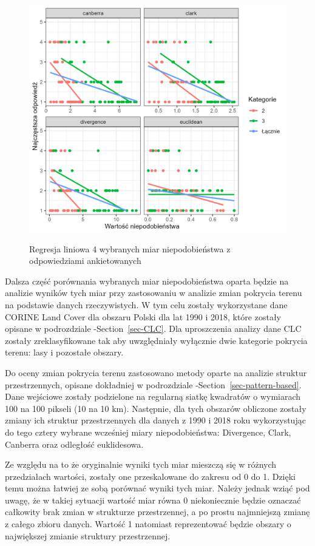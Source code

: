 \documentclass{amuthesis}
\begin{document}
\begin{figure}[t]

{\centering \includegraphics[width=4.6875in,height=4.16667in]{figures/fig-top4measures.png}

}

\caption{\label{fig-top4measures}Regresja liniowa 4 wybranych miar
niepodobieństwa z odpowiedziami ankietowanych}

\end{figure}

Dalsza część porównania wybranych miar niepodobieństwa oparta będzie na
analizie wyników tych miar przy zastosowaniu w analizie zmian pokrycia
terenu na podstawie danych rzeczywistych. W tym celu zostały
wykorzystane dane CORINE Land Cover dla obszaru Polski dla lat 1990 i
2018, które zostały opisane w podrozdziale -Section~\ref{sec-CLC}. Dla
uproszczenia analizy dane CLC zostały zreklasyfikowane tak aby
uwzględniały wyłącznie dwie kategorie pokrycia terenu: lasy i pozostałe
obszary.

Do oceny zmian pokrycia terenu zastosowano metody oparte na analizie
struktur przestrzennych, opisane dokładniej w podrozdziale
-Section~\ref{sec-pattern-based}. Dane wejściowe zostały podzielone na
regularną siatkę kwadratów o wymiarach 100 na 100 pikseli (10 na 10 km).
Następnie, dla tych obszarów obliczone zostały zmiany ich struktur
przestrzennych dla danych z 1990 i 2018 roku wykorzystując do tego
cztery wybrane wcześniej miary niepodobieństwa: Divergence, Clark,
Canberra oraz odległość euklidesowa.

Ze względu na to że oryginalnie wyniki tych miar mieszczą się w różnych
przedziałach wartości, zostały one przeskalowane do zakresu od 0 do 1.
Dzięki temu można łatwiej ze sobą porównać wyniki tych miar. Należy
jednak wziąć pod uwagę, że w takiej sytuacji wartość miar równa 0
niekoniecznie będzie oznaczać całkowity brak zmian w strukturze
przestrzennej, a po prostu najmniejszą zmianę z całego zbioru danych.
Wartość 1 natomiast reprezentować będzie obszary o największej zmianie
struktury przestrzennej.
\end{document}
